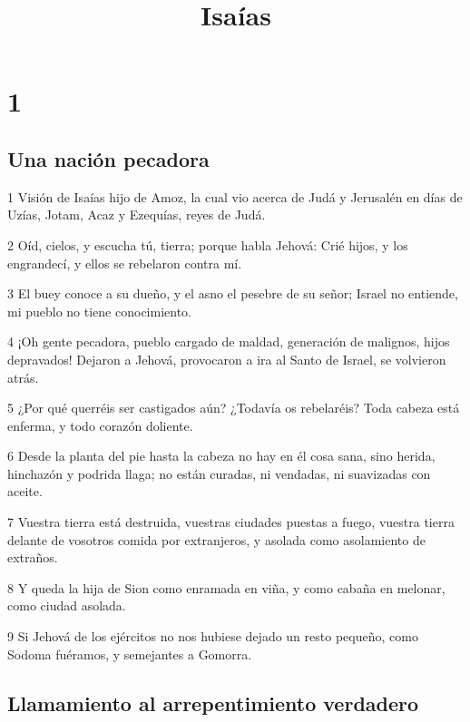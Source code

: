 

\title{Isaías}

\chapter{1}

\section*{Una nación pecadora}

\par 1 Visión de Isaías hijo de Amoz, la cual vio acerca de Judá y Jerusalén en días de Uzías, Jotam, Acaz y Ezequías, reyes de Judá.
\par 2 Oíd, cielos, y escucha tú, tierra; porque habla Jehová: Crié hijos, y los engrandecí, y ellos se rebelaron contra mí.
\par 3 El buey conoce a su dueño, y el asno el pesebre de su señor; Israel no entiende, mi pueblo no tiene conocimiento.
\par 4 ¡Oh gente pecadora, pueblo cargado de maldad, generación de malignos, hijos depravados! Dejaron a Jehová, provocaron a ira al Santo de Israel, se volvieron atrás.
\par 5 ¿Por qué querréis ser castigados aún? ¿Todavía os rebelaréis? Toda cabeza está enferma, y todo corazón doliente.
\par 6 Desde la planta del pie hasta la cabeza no hay en él cosa sana, sino herida, hinchazón y podrida llaga; no están curadas, ni vendadas, ni suavizadas con aceite.
\par 7 Vuestra tierra está destruida, vuestras ciudades puestas a fuego, vuestra tierra delante de vosotros comida por extranjeros, y asolada como asolamiento de extraños.
\par 8 Y queda la hija de Sion como enramada en viña, y como cabaña en melonar, como ciudad asolada.
\par 9 Si Jehová de los ejércitos no nos hubiese dejado un resto pequeño, como Sodoma fuéramos, y semejantes a Gomorra. 

\section*{Llamamiento al arrepentimiento verdadero}

